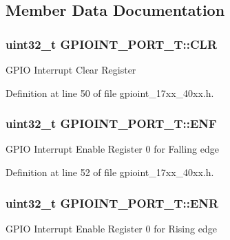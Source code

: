 \subsection{Member Data Documentation}
\subsubsection[{\texorpdfstring{C\+LR}{CLR}}]{ uint32\+\_\+t G\+P\+I\+O\+I\+N\+T\+\_\+\+P\+O\+R\+T\+\_\+\+T\+::\+C\+LR}\hypertarget{structGPIOINT__PORT__T_aca139ec8cd0a157793ab02b63caaa32b}{}\label{structGPIOINT__PORT__T_aca139ec8cd0a157793ab02b63caaa32b}
G\+P\+IO Interrupt Clear Register 

Definition at line 50 of file gpioint\+\_\+17xx\+\_\+40xx.\+h.

\subsubsection[{\texorpdfstring{E\+NF}{ENF}}]{ uint32\+\_\+t G\+P\+I\+O\+I\+N\+T\+\_\+\+P\+O\+R\+T\+\_\+\+T\+::\+E\+NF}\hypertarget{structGPIOINT__PORT__T_ac0330b9c737da49042c1318175e13038}{}\label{structGPIOINT__PORT__T_ac0330b9c737da49042c1318175e13038}
G\+P\+IO Interrupt Enable Register 0 for Falling edge 

Definition at line 52 of file gpioint\+\_\+17xx\+\_\+40xx.\+h.

\subsubsection[{\texorpdfstring{E\+NR}{ENR}}]{ uint32\+\_\+t G\+P\+I\+O\+I\+N\+T\+\_\+\+P\+O\+R\+T\+\_\+\+T\+::\+E\+NR}\hypertarget{structGPIOINT__PORT__T_aec2ea22900c6c655ffe5da100027c792}{}\label{structGPIOINT__PORT__T_aec2ea22900c6c655ffe5da100027c792}
G\+P\+IO Interrupt Enable Register 0 for Rising edge 

